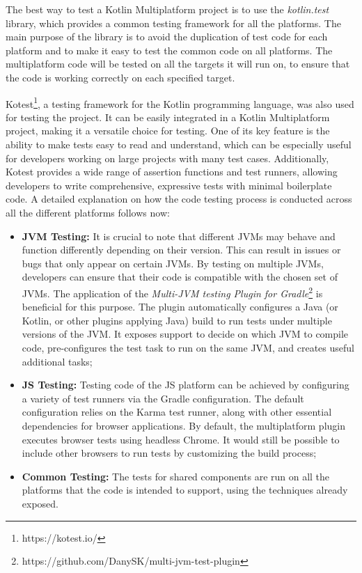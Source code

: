 The best way to test a Kotlin Multiplatform project is to use the \textit{kotlin.test} library, which provides a common testing framework for all the platforms. The main purpose of the library is to avoid the duplication of test code for each platform and to make it easy to test the common code on all platforms. The multiplatform code will be tested on all the targets it will run on, to ensure that the code is working correctly on each specified target.\newline

Kotest\footnote{https://kotest.io/}, a testing framework for the Kotlin programming language, was also used for testing the project. It can be easily integrated in a Kotlin Multiplatform project, making it a versatile choice for testing. One of its key feature is the ability to make tests easy to read and understand, which can be especially useful for developers working on large projects with many test cases. Additionally, Kotest provides a wide range of assertion functions and test runners, allowing developers to write comprehensive, expressive tests with minimal boilerplate code. A detailed explanation on how the code testing process is conducted across all the different platforms follows now:
\begin{itemize}
	\item \textbf{JVM Testing:} It is crucial to note that different JVMs may behave and function differently depending on their version. This can result in issues or bugs that only appear on certain JVMs. By testing on multiple JVMs, developers can ensure that their code is compatible with the chosen set of JVMs. The application of the \textit{Multi-JVM testing Plugin for Gradle}\footnote{https://github.com/DanySK/multi-jvm-test-plugin} is beneficial for this purpose. The plugin automatically configures a Java (or Kotlin, or other plugins applying Java) build to run tests under multiple versions of the JVM. It exposes support to decide on which JVM to compile code, pre-configures the test task to run on the same JVM, and creates useful additional tasks;
	\item \textbf{JS Testing:} Testing code of the JS platform can be achieved by configuring a variety of test runners via the Gradle configuration. The default configuration relies on the Karma test runner, along with other essential dependencies for browser applications. By default, the multiplatform plugin executes browser tests using headless Chrome. It would still be possible to include other browsers to run tests by customizing the build process;
	\item \textbf{Common Testing:} The tests for shared components are run on all the platforms that the code is intended to support, using the techniques already exposed.
\end{itemize}

